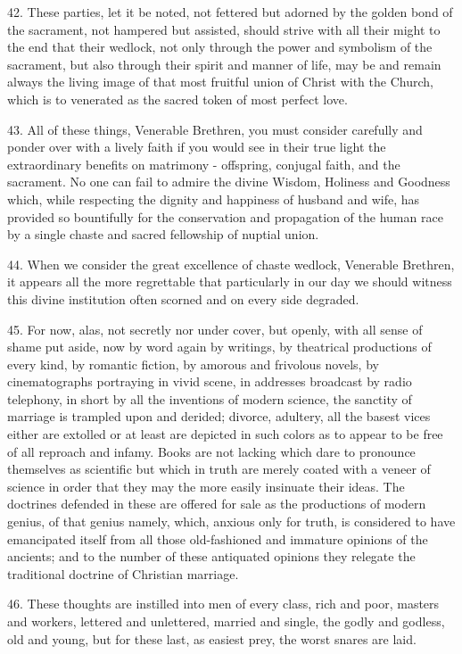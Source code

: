 \documentclass[12pt,a4paper]{book}
\begin{document}
42. These parties, let it be noted, not fettered but adorned by the golden bond of the sacrament, not hampered but assisted, should strive with all their might to the end that their wedlock, not only through the power and symbolism of the sacrament, but also through their spirit and manner of life, may be and remain always the living image of that most fruitful union of Christ with the Church, which is to venerated as the sacred token of most perfect love.

43. All of these things, Venerable Brethren, you must consider carefully and ponder over with a lively faith if you would see in their true light the extraordinary benefits on matrimony - offspring, conjugal faith, and the sacrament. No one can fail to admire the divine Wisdom, Holiness and Goodness which, while respecting the dignity and happiness of husband and wife, has provided so bountifully for the conservation and propagation of the human race by a single chaste and sacred fellowship of nuptial union.

44. When we consider the great excellence of chaste wedlock, Venerable Brethren, it appears all the more regrettable that particularly in our day we should witness this divine institution often scorned and on every side degraded.

45. For now, alas, not secretly nor under cover, but openly, with all sense of shame put aside, now by word again by writings, by theatrical productions of every kind, by romantic fiction, by amorous and frivolous novels, by cinematographs portraying in vivid scene, in addresses broadcast by radio telephony, in short by all the inventions of modern science, the sanctity of marriage is trampled upon and derided; divorce, adultery, all the basest vices either are extolled or at least are depicted in such colors as to appear to be free of all reproach and infamy. Books are not lacking which dare to pronounce themselves as scientific but which in truth are merely coated with a veneer of science in order that they may the more easily insinuate their ideas. The doctrines defended in these are offered for sale as the productions of modern genius, of that genius namely, which, anxious only for truth, is considered to have emancipated itself from all those old-fashioned and immature opinions of the ancients; and to the number of these antiquated opinions they relegate the traditional doctrine of Christian marriage.

46. These thoughts are instilled into men of every class, rich and poor, masters and workers, lettered and unlettered, married and single, the godly and godless, old and young, but for these last, as easiest prey, the worst snares are laid.
\end{document}
